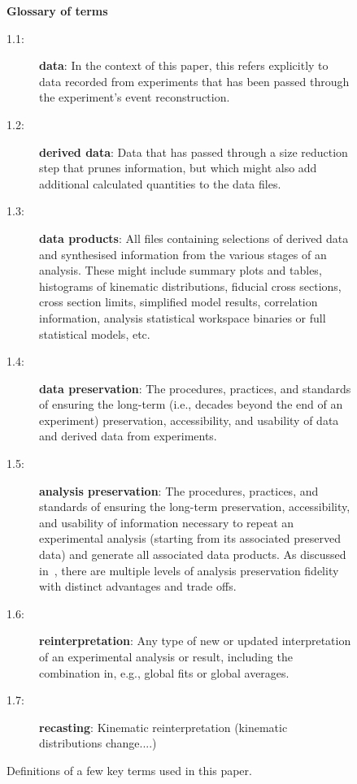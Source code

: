 \documentclass[11pt]{article}
\begin{document}
\begin{figure}[!ht]
\begin{tcolorbox}
\begin{center}
{\large \textbf{Glossary of terms}}
\end{center}
%
\begin{description}
    \item[1.1:] \textbf{\Gls{data}}: In the context of this paper, this refers explicitly to data recorded from experiments that has been passed through the experiment's event reconstruction.
    \item[1.2:] \textbf{\Gls{derived data}}: Data that has passed through a size reduction step that prunes information, but which might also add additional calculated quantities to the data files.
    \item[1.3:] \textbf{\Glspl{data product}}: All files containing selections of derived data and synthesised information from the various stages of an analysis.
These might include summary plots and tables, histograms of kinematic distributions, fiducial cross sections, cross section limits, simplified model results, correlation information, analysis statistical workspace binaries or full statistical models, etc.
    \item[1.4:] \textbf{\Gls{data preservation}}: The procedures, practices, and standards of ensuring the long-term (i.e., decades beyond the end of an experiment) preservation, accessibility, and usability of data and derived data from experiments.
    \item[1.5:] \textbf{\Gls{analysis preservation}}: The procedures, practices, and standards of ensuring the long-term preservation, accessibility, and usability of information necessary to repeat an experimental analysis (starting from its associated preserved data) and generate all associated \glspl{data product}.
    As discussed in~, there are multiple levels of analysis preservation fidelity with distinct advantages and trade offs.
    \item[1.6:] \textbf{\Gls{reinterpretation}}: Any type of new or updated interpretation of an experimental analysis or result, including the combination in, e.g., global fits or global averages. 
    \item[1.7:] \textbf{\Gls{recasting}}: Kinematic reinterpretation (kinematic distributions change....) %
\end{description}
\end{tcolorbox}
\caption{Definitions of a few key terms used in this paper.}
\label{fig:glossary}
\end{figure}
\end{document}

